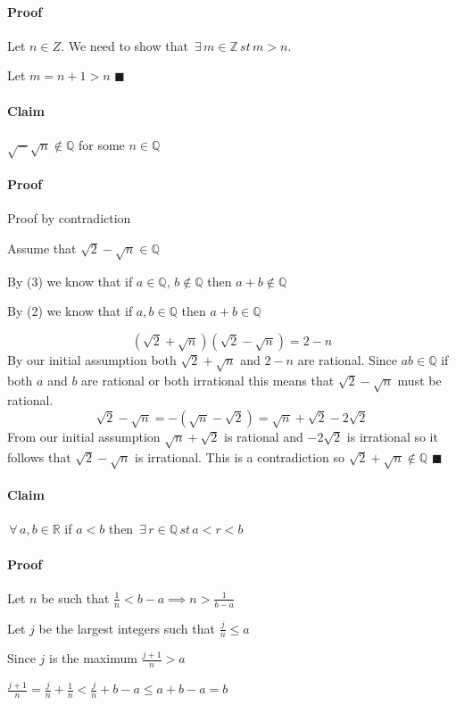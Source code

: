 \documentclass{article}
\newcommand{\bb}[1]{\mathbb{#1}}
\newcommand{\A}{\,\forall\,}
\newcommand{\E}{\,\exists\,}
\begin{document}
\paragraph{Proof} Let \(n\in Z\). We need to show that \(\E m\in\bb Z\,st\,m>n\).

Let \(m=n+1>n\) \(\blacksquare\)

\paragraph{Claim} \(\sqrt -\sqrt n\notin \bb Q\) for some \(n\in\bb Q\)

\paragraph{Proof} Proof by contradiction

Assume that \(\sqrt 2-\sqrt n\in \bb Q\)

By (3) we know that if \(a\in\bb Q,\,b\notin\bb Q\) then \(a+b\notin\bb Q\)

By (2) we know that if \(a,b\in\bb Q\) then \(a+b\in\bb Q\)

\[(\sqrt 2+\sqrt n)(\sqrt 2-\sqrt n)=2-n\]
By our initial assumption both \(\sqrt 2+\sqrt n\) and \(2-n\) are rational. Since \(ab\in\bb Q\) if both \(a\) and \(b\) are rational or both irrational this means that \(\sqrt 2-\sqrt n\) must be rational.
\[\sqrt 2-\sqrt n=-(\sqrt n-\sqrt 2)=\sqrt n+\sqrt 2-2\sqrt 2\]
From our initial assumption \(\sqrt n+\sqrt 2\) is rational and \(-2\sqrt2\) is irrational so it follows that \(\sqrt 2-\sqrt n\) is irrational. This is a contradiction so \(\sqrt 2+\sqrt n\notin\bb Q\) \(\blacksquare\)

\paragraph{Claim} \(\A a,b\in\bb R\) if \(a<b\) then \(\E r\in\bb Q\,st\,a<r<b\)

\paragraph{Proof} Let \(n\) be such that \(\frac1n<b-a\implies n>\frac{1}{b-a}\)

Let \(j\) be the largest integers such that \(\frac jn\le a\)

Since \(j\) is the maximum \(\frac{j+1}{n}>a\)

\(\frac{j+1}{n}=\frac jn+\frac1n<\frac jn+b-a\le a+b-a=b\)
\end{document}
